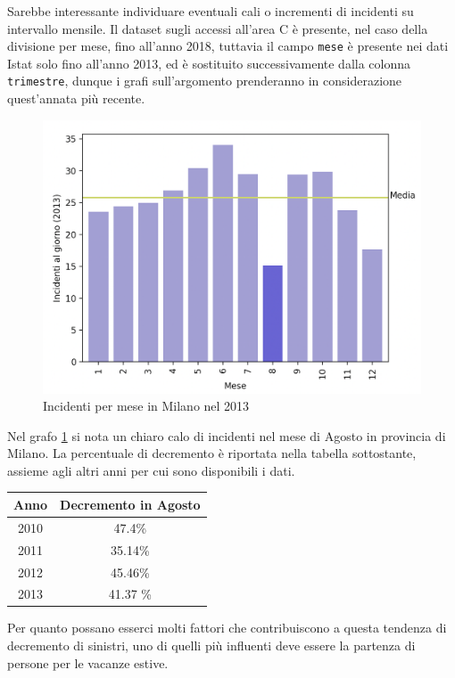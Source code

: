 \documentclass[a4paper,12pt]{report}
\newcommand{\columnstyle}[1]{\texttt{#1}}
\begin{document}
Sarebbe interessante individuare eventuali cali o incrementi di incidenti 
su intervallo mensile.
Il dataset sugli accessi all'area C è presente, nel caso della divisione per 
mese, fino all'anno 2018, tuttavia il campo \columnstyle{mese} è presente nei 
dati Istat solo fino all'anno 2013, ed è sostituito successivamente 
dalla colonna \columnstyle{trimestre}, dunque i grafi sull'argomento prenderanno 
in considerazione quest'annata più recente.

\begin{figure}
    \hfill\includegraphics[width=0.7\linewidth]{../src/incidenti/incidenti_senza_coords/mese_incidenti/milano_mese.png}\hspace*{\fill}
    \caption{Incidenti per mese in Milano nel 2013}
    \label{fig:milano-mese}
\end{figure}

Nel grafo \ref{fig:milano-mese} si nota un chiaro calo di incidenti nel mese di 
Agosto in provincia di Milano. 
La percentuale di decremento è riportata nella tabella sottostante, assieme agli 
altri anni per cui sono disponibili i dati.

\begin{center}
    \def\arraystretch{1.5}%
    \begin{tabular}{ |c|c| } 
        \hline
        Anno & Decremento in Agosto \\ 
        \hline
        2010 & 47.4\%  \\ 
        \rowcolor{TableGray}
        2011 & 35.14\% \\
        2012 & 45.46\% \\
        \rowcolor{TableGray}
        2013 & 41.37 \% \\
        \hline
    \end{tabular}
\end{center}

Per quanto possano esserci molti fattori che contribuiscono a questa tendenza di 
decremento di sinistri, uno di quelli più influenti deve essere la partenza 
di persone per le vacanze estive.
\end{document}
